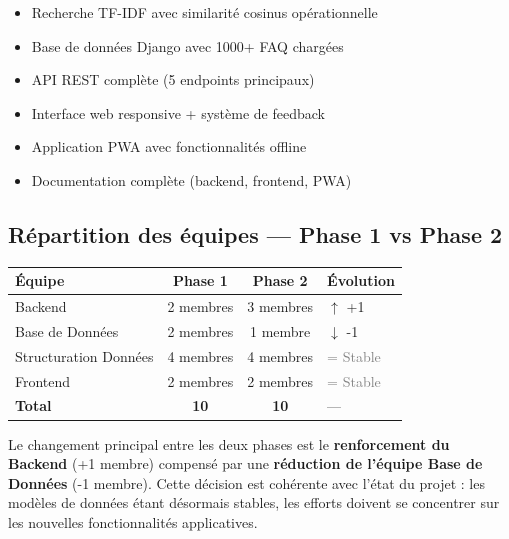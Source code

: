 \documentclass[11pt,a4paper]{article}
\begin{document}
\vspace{0.5cm}

\begin{phase1box}
\begin{itemize}
    \item[\ding{52}] Recherche TF-IDF avec similarité cosinus opérationnelle
    \item[\ding{52}] Base de données Django avec 1000+ FAQ chargées
    \item[\ding{52}] API REST complète (5 endpoints principaux)
    \item[\ding{52}] Interface web responsive + système de feedback
    \item[\ding{52}] Application PWA avec fonctionnalités offline
    \item[\ding{52}] Documentation complète (backend, frontend, PWA)
\end{itemize}
\end{phase1box}

\subsection{Répartition des équipes — Phase 1 vs Phase 2}

\vspace{0.3cm}
\begin{center}
\begin{tabular}{l c c l}
\toprule
\textbf{Équipe} & \textbf{Phase 1} & \textbf{Phase 2} & \textbf{Évolution} \\
\midrule
Backend           & 2 membres & 3 membres & \textcolor{phase2color}{$\uparrow$ +1} \\
Base de Données   & 2 membres & 1 membre  & \textcolor{phase1color}{$\downarrow$ -1} \\
Structuration Données & 4 membres & 4 membres & \textcolor{gray}{= Stable} \\
Frontend          & 2 membres & 2 membres & \textcolor{gray}{= Stable} \\
\midrule
\textbf{Total}    & \textbf{10} & \textbf{10} & — \\
\bottomrule
\end{tabular}
\end{center}

\vspace{0.5cm}

\begin{info}
Le changement principal entre les deux phases est le \textbf{renforcement du Backend} (+1 membre) compensé par une \textbf{réduction de l'équipe Base de Données} (-1 membre). Cette décision est cohérente avec l'état du projet : les modèles de données étant désormais stables, les efforts doivent se concentrer sur les nouvelles fonctionnalités applicatives.
\end{info}
\end{document}
